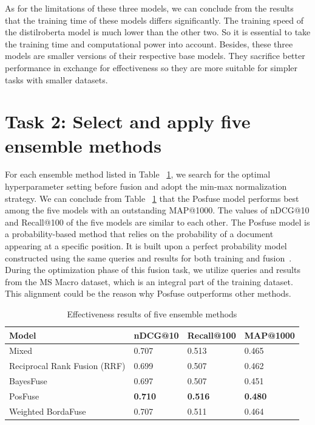 \documentclass[acmsmall]{acmart}
\begin{document}
As for the limitations of these three models, we can conclude from the results that the training time of these models differs significantly. The training speed of the distilroberta model is much lower than the other two. So it is essential to take the training time and computational power into account. Besides, these three models are smaller versions of their respective base models. They sacrifice better performance in exchange for effectiveness so they are more suitable for simpler tasks with smaller datasets.

\section{Task 2: Select and apply five ensemble methods}
For each ensemble method listed in Table ~\ref{tab:results-task2}, we search for the optimal hyperparameter setting before fusion and adopt the min-max normalization strategy. We can conclude from Table ~\ref{tab:results-task2} that the Posfuse model performs best among the five models with an outstanding MAP@1000. The values of nDCG@10 and Recall@100 of the five models are similar to each other. The Posfuse model is a probability-based method that relies on the probability of a document appearing at a specific position. It is built upon a perfect probability model constructed using the same queries and results for both training and fusion~\cite{DBLP:conf/sigir/LillisZTCLD10}. During the optimization phase of this fusion task, we utilize queries and results from the MS Macro dataset, which is an integral part of the training dataset. This alignment could be the reason why Posfuse outperforms other methods.

\begin{table}[!ht]
    \centering
    \caption{Effectiveness results of five ensemble methods}
    \label{tab:results-task2}
    \begin{tabular}{llll}
       \toprule
       \textbf{Model} &  \textbf{nDCG@10} & \textbf{Recall@100} & \textbf{MAP@1000}\\
       \midrule
       Mixed & 0.707 & 0.513 & 0.465\\
       Reciprocal Rank Fusion (RRF) & 0.699 & 0.507 & 0.462\\
       BayesFuse & 0.697 & 0.507 & 0.451\\
       PosFuse & \textbf{0.710} & \textbf{0.516} & \textbf{0.480}\\
       Weighted BordaFuse & 0.707 & 0.511 & 0.464\\
       \bottomrule
    \end{tabular}
\end{table}
\end{document}
